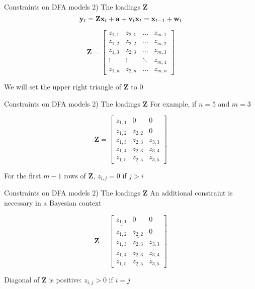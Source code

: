 \documentclass[
  ignorenonframetext,
]{beamer}
\begin{document}
\begin{frame}{Constraints on DFA models \textbar{} 2) The loadings
\(\mathbf{Z}\)}
\protect\hypertarget{constraints-on-dfa-models-2-the-loadings-mathbfz-1}{}
\[
\mathbf{y}_t = \mathbf{Z} \mathbf{x}_t + \mathbf{a} + \mathbf{v}_t \\
\mathbf{x}_t = \mathbf{x}_{t-1} + \mathbf{w}_t
\]

\[
\mathbf{Z} =
\begin{bmatrix}
 z_{1,1} & z_{2,1} & \dots & z_{m,1} \\
 z_{1,2} & z_{2,2} & \dots & z_{m,2} \\
 z_{1,3} & z_{2,3} & \dots & z_{m,3} \\
 \vdots & \vdots & \ddots & z_{m,4} \\
 z_{1,n} & z_{2,n} & \dots & z_{m,n}
\end{bmatrix}
\]

We will set the upper right triangle of \(\mathbf{Z}\) to 0
\end{frame}

\begin{frame}{Constraints on DFA models \textbar{} 2) The loadings
\(\mathbf{Z}\)}
\protect\hypertarget{constraints-on-dfa-models-2-the-loadings-mathbfz-2}{}
For example, if \(n = 5\) and \(m = 3\)

\[
\mathbf{Z} =
\begin{bmatrix}
 z_{1,1} & 0 & 0 \\
 z_{1,2} & z_{2,2} & 0 \\
 z_{1,3} & z_{2,3} & z_{3,3} \\
 z_{1,4} & z_{2,3} & z_{3,4} \\
 z_{1,5} & z_{2,5} & z_{3,5}
\end{bmatrix}
\]

For the first \(m - 1\) rows of \(\mathbf{Z}\), \(z_{i,j} = 0\) if
\(j > i\)
\end{frame}

\begin{frame}{Constraints on DFA models \textbar{} 2) The loadings
\(\mathbf{Z}\)}
\protect\hypertarget{constraints-on-dfa-models-2-the-loadings-mathbfz-3}{}
An additional constraint is necessary in a Bayesian context

\[
\mathbf{Z} =
\begin{bmatrix}
 \underline{z_{1,1}} & 0 & 0 \\
 z_{1,2} & \underline{z_{2,2}} & 0 \\
 z_{1,3} & z_{2,3} & \underline{z_{3,3}} \\
 z_{1,4} & z_{2,3} & z_{3,4} \\
 z_{1,5} & z_{2,5} & z_{3,5}
\end{bmatrix}
\]

Diagonal of \(\mathbf{Z}\) is positive: \(z_{i,j} > 0\) if \(i = j\)
\end{frame}
\end{document}
